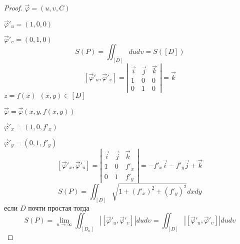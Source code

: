 \begin{proof}
  $\vec \varphi = (u, \upsilon, C)$

  $\vec \varphi'_u = (1,0,0)$

  $\vec \varphi'_{\upsilon} = (0,1,0)$
  $$
  S(P) = \iint_{[D]} dud\upsilon = S([D])
  $$
  $$
  [\vec \varphi'_u, \vec \varphi'_{\upsilon}] =
  \left|
  \begin{array}{ccc}
    \vec i & \vec j & \vec k \\
    1 & 0 & 0 \\
    0 & 1 & 0
  \end{array}
  \right| = \vec k
  $$
  $z = f(x) ~~ (x, y) \in [D]$

  $\vec \varphi = \vec \varphi(x, y, f(x,y))$

  $\vec \varphi'_x = (1, 0, f'_x)$

  $\vec \varphi'_y = (0, 1, f'_y)$
  $$
  [\vec \varphi'_x, \vec \varphi'_u] =
  \left|
  \begin{array}{ccc}
    \vec i & \vec j & \vec k \\
    1 & 0 & f'_x \\
    0 & 1 & f'_y
  \end{array}
  \right| = -f'_x \vec i - f'_y \vec j + \vec k
  $$
  $$
  S(P) = \iint_{[D]} \sqrt{1 + (f'_x)^2 + (f'_y)^2} dxdy
  $$
  если $D$ почти простая тогда
  $$
  S(P) = \lim_{n \to \infty} \iint_{[D_n]} |[\vec \varphi'_u,
  \vec \varphi'_{\upsilon}]| du d\upsilon = \iint_{[D]} |[\vec \varphi'_u,
  \vec \varphi'_{\upsilon}]| du d\upsilon
  $$
\end{proof}
